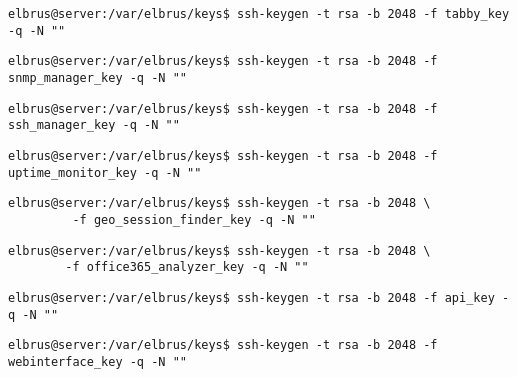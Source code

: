 \documentclass{article}
\begin{document}
	\lstset{style=commands}
	\begin{lstlisting}[caption={Erstellen des SSH-Keys der für das Herunterladen der Kernsoftware 'tabby' benötigt wird.}]
		elbrus@server:/var/elbrus/keys$ ssh-keygen -t rsa -b 2048 -f tabby_key -q -N ""
	\end{lstlisting}

	\lstset{style=commands}
	\begin{lstlisting}[caption={Erstellen des SSH-keys der für das Herunterladen des 'SNMP-Managers' benötigt wird.}]
		elbrus@server:/var/elbrus/keys$ ssh-keygen -t rsa -b 2048 -f snmp_manager_key -q -N ""
	\end{lstlisting}

	\lstset{style=commands}
	\begin{lstlisting}[caption={Erstellen des SSH-keys der für das Herunterladen des 'SSH-Managers' benötigt wird.}]
		elbrus@server:/var/elbrus/keys$ ssh-keygen -t rsa -b 2048 -f ssh_manager_key -q -N ""
	\end{lstlisting}
	
	\lstset{style=commands}
	\begin{lstlisting}[caption={Erstellen des SSH-keys der für das Herunterladen des 'Uptime-Monitors' benötigt wird.}]
		elbrus@server:/var/elbrus/keys$ ssh-keygen -t rsa -b 2048 -f uptime_monitor_key -q -N ""
	\end{lstlisting}
	
	\lstset{style=commands}
	\begin{lstlisting}[caption={Erstellen des SSH-keys der für das Herunterladen des 'geo session finders' benötigt wird.}]
		elbrus@server:/var/elbrus/keys$ ssh-keygen -t rsa -b 2048 \
		 -f geo_session_finder_key -q -N ""
	\end{lstlisting}

	\lstset{style=commands}
	\begin{lstlisting}[caption={Erstellen des SSH-keys der für das Herunterladen des 'office365 analyzers' benötigt wird.}]
		elbrus@server:/var/elbrus/keys$ ssh-keygen -t rsa -b 2048 \
		-f office365_analyzer_key -q -N ""
	\end{lstlisting}
	
	\lstset{style=commands}
	\begin{lstlisting}[caption={Erstellen des SSH-keys der für das Herunterladen der 'API' benötigt wird.}]
		elbrus@server:/var/elbrus/keys$ ssh-keygen -t rsa -b 2048 -f api_key -q -N ""
	\end{lstlisting}
	
	\lstset{style=commands}
	\begin{lstlisting}[caption={Erstellen des SSH-keys der für das Herunterladen des 'Webinterfaces' benötigt wird.}]
		elbrus@server:/var/elbrus/keys$ ssh-keygen -t rsa -b 2048 -f webinterface_key -q -N ""
	\end{lstlisting}
\end{document}
